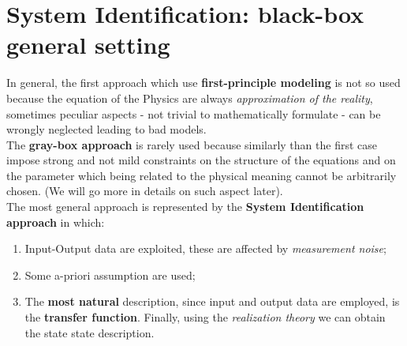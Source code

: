 \section{System Identification: black-box general setting}
\noindent
In general, the first approach which use \textbf{first-principle modeling} is not so used because the equation of the Physics are always \textit{approximation of the reality}, sometimes peculiar aspects - not trivial to mathematically formulate - can be wrongly neglected leading to bad models.\\
The \textbf{gray-box approach} is rarely used because similarly than the first case impose strong and not mild constraints on the structure of the equations and on the parameter which being related to the physical meaning cannot be arbitrarily chosen. (We will go more in details on such aspect later).\\
The most general approach is represented by the \textbf{System Identification approach} in which:
\begin{enumerate}
    \item Input-Output data are exploited, these are affected by \textit{measurement noise};
    \item Some a-priori assumption are used; 
    \item The \textbf{most natural} description, since input and output data are employed, is the \textbf{transfer function}. Finally, using the \textit{realization theory} we can obtain the state state description.
\end{enumerate}

\hspace*{-5mm}
%

